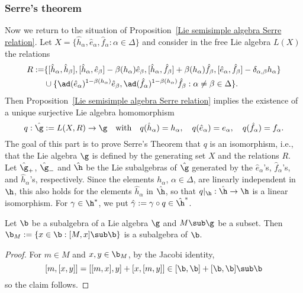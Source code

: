 \subsubsection{Serre's theorem}
Now we return to the situation of Proposition~\ref{Lie semisimple algebra Serre relation}. Let $X=\{\hat{h}_\alpha,\hat{e}_\alpha,\hat{f}_\alpha:\alpha\in\Delta\}$ and consider in the free Lie algebra $L(X)$ the relations
\begin{align*}
R:=&\{[\hat{h}_\alpha,\hat{h}_\beta],[\hat{h}_\alpha,\hat{e}_\beta]-\beta(h_\alpha)\hat{e}_\beta,[\hat{h}_\alpha,\hat{f}_\beta]+\beta(h_\alpha)\hat{f}_\beta,[\hat{e}_\alpha,\hat{f}_\beta]-\delta_{\alpha,\beta}h_\alpha\}\\
&\cup\{\ad(\hat{e}_\alpha)^{1-\beta(h_\alpha)}\hat{e}_\beta,\ad(\hat{f}_\alpha)^{1-\beta(h_\alpha)}\hat{f}_\beta:\alpha\neq\beta\in\Delta\}.
\end{align*}
Then Proposition~\ref{Lie semisimple algebra Serre relation} implies the existence of a unique surjective Lie algebra homomorphism
\[q:\hat{\g}:=L(X,R)\to\g\quad\text{with}\quad q(\hat{h}_\alpha)=h_\alpha,\quad q(\hat{e}_\alpha)=e_\alpha,\quad q(\hat{f}_\alpha)=f_\alpha.\]
The goal of this part is to prove Serre's Theorem that $q$ is an isomorphism, i.e., that the Lie algebra $\g$ is defined by the generating set $X$ and the relations $R$. Let $\hat{\g}_+$, $\hat{\g}_-$ and $\hat{\h}$ be the Lie subalgebras of $\hat{\g}$ generated by the $\hat{e}_\alpha$'s, $\hat{f}_\alpha$'s, and $\hat{h}_\alpha$'s, respectively. Since the elements $h_\alpha$, $\alpha\in\Delta$, are linearly independent in $\h$, this also holds for the elements $\hat{h}_\alpha$ in $\hat{\h}$, so that $q|_{\h}:\hat{\h}\to\h$ is a linear isomorphism. For $\gamma\in\h^*$, we put $\hat{\gamma}:=\gamma\circ q\in\hat{\h}^*$.
\begin{lemma}\label{Lie algebra normalizer of subset is subalgebra}
Let $\b$ be a subalgebra of a Lie algebra $\g$ and $M\sub\g$ be a subset. Then $\b_M:=\{x\in\b:[M,x]\sub\b\}$ is a subalgebra of $\b$.
\end{lemma}
\begin{proof}
For $m\in M$ and $x,y\in\b_M$, by the Jacobi identity,
\[[m,[x,y]]=[[m,x],y]+[x,[m,y]]\in[\b,\b]+[\b,\b]\sub\b\]
so the claim follows.
\end{proof}

